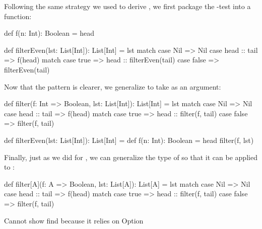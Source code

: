 \documentclass{book}
\begin{document}
Following the same strategy we used to derive , we first package
the -test into a function:

\begin{scalacode}
def f(n: Int): Boolean = head %

def filterEven(lst: List[Int]): List[Int] = lst match {
  case Nil => Nil
  case head :: tail =>
    f(head) match {
      case true => head :: filterEven(tail)
      case false => filterEven(tail)
    }
}
\end{scalacode}

Now that the pattern is clearer, we generalize  to take 
as an argument:

\begin{scalacode}
def filter(f: Int => Boolean, lst: List[Int]): List[Int] = lst match {
  case Nil => Nil
  case head :: tail =>
    f(head) match {
      case true => head :: filter(f, tail)
      case false => filter(f, tail)
    }
}

def filterEven(lst: List[Int]): List[Int] = {
  def f(n: Int): Boolean = head %
  filter(f, lst)
}
\end{scalacode}

Finally, just as we did for , we can generalize the type of 
so that it can be applied to :

\begin{scalacode}
def filter[A](f: A => Boolean, lst: List[A]): List[A] = lst match {
  case Nil => Nil
  case head :: tail =>
    f(head) match {
      case true => head :: filter(f, tail)
      case false => filter(f, tail)
    }
}
\end{scalacode}

\begin{instructor}
Cannot show find because it relies on Option
\end{instructor}



\end{document}
